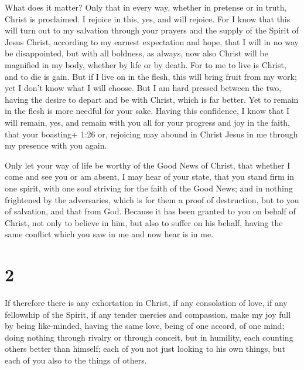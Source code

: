  What does it matter? Only that in every way, whether in
pretense or in truth, Christ is proclaimed. I rejoice in this, yes, and
will rejoice.  For I know that this will turn out to my
salvation through your prayers and the supply of the Spirit of Jesus
Christ,  according to my earnest expectation and hope, that
I will in no way be disappointed, but with all boldness, as always, now
also Christ will be magnified in my body, whether by life or by death.
 For to me to live is Christ, and to die is gain.
 But if I live on in the flesh, this will bring fruit from
my work; yet I don't know what I will choose.  But I am
hard pressed between the two, having the desire to depart and be with
Christ, which is far better.  Yet to remain in the flesh is
more needful for your sake.  Having this confidence, I know
that I will remain, yes, and remain with you all for your progress and
joy in the faith,  that your boasting+ 1:26 or, rejoicing
may abound in Christ Jesus in me through my presence with you again.

 Only let your way of life be worthy of the Good News of
Christ, that whether I come and see you or am absent, I may hear of your
state, that you stand firm in one spirit, with one soul striving for the
faith of the Good News;  and in nothing frightened by the
adversaries, which is for them a proof of destruction, but to you of
salvation, and that from God.  Because it has been granted
to you on behalf of Christ, not only to believe in him, but also to
suffer on his behalf,  having the same conflict which you
saw in me and now hear is in me.

\hypertarget{section-1}{%
\section{2}\label{section-1}}

 If therefore there is any exhortation in Christ, if any
consolation of love, if any fellowship of the Spirit, if any tender
mercies and compassion,  make my joy full by being
like-minded, having the same love, being of one accord, of one mind;
 doing nothing through rivalry or through conceit, but in
humility, each counting others better than himself;  each of
you not just looking to his own things, but each of you also to the
things of others.

